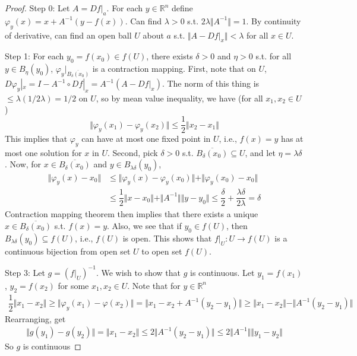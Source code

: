 \documentclass{article}
\theoremstyle{definition}
\theoremstyle{remark}
\theoremstyle{plain}
\theoremstyle{definition}
\newcommand{\RR}{\mathbb{R}}
\begin{document}
\begin{proof}
    Step 0: Let $A=Df|_a$. For each $y\in\RR^n$ define $\varphi_y(x)=x+A^{-1}(y-f(x))$.
    Can find $\lambda>0$ s.t. $2\lambda\Vert A^{-1}\Vert=1$. By continuity of derivative, can find an open ball $U$ about $a$ s.t. $\Vert A-Df|_x\Vert<\lambda$ for all $x\in U$. 

    Step 1: For each $y_0=f(x_0)\in f(U)$, there exists $\delta>0$ and $\eta>0$ s.t. for all $y\in B_{\eta}(y_0)$, $\varphi_y|_{\overline{B_{\delta}(x_0)}}$ is a contraction mapping. First, note that on $U$, $D\varphi_y|_x=I-A^{-1}\circ Df|_x=A^{-1}(A-Df|_x)$. The norm of this thing is $\le \lambda(1/2\lambda)=1/2$ on $U$, so by mean value inequality, we have (for all $x_1,x_2\in U$)
    \[\Vert\varphi_y(x_1)-\varphi_y(x_2)\Vert\le \dfrac{1}{2}\Vert x_2-x_1\Vert\] This implies that $\varphi_y$ can have at most one fixed point in $U$, i.e., $f(x)=y$ has at most one solution for $x$ in $U$.
    Second, pick $\delta>0$ s.t. $\overline{B_\delta(x_0)}\subseteq U$, and let $\eta=\lambda \delta$. 
    Now, for $x\in \overline{B_\delta(x_0)}$ and $y\in B_{\lambda\delta}(y_0)$,
    \begin{align*}\Vert\varphi_y(x)-x_0\Vert&\le \Vert\varphi_y(x)-\varphi_y(x_0)\Vert+\Vert\varphi_y(x_0)-x_0\Vert\\
    &\le \dfrac{1}{2}\Vert x-x_0\Vert+\Vert A^{-1}\Vert \Vert y-y_0\Vert\le \dfrac{\delta}{2}+\dfrac{\lambda \delta}{2\lambda}=\delta
    \end{align*}
    Contraction mapping theorem then implies that there exists a unique $x\in \overline{B_\delta(x_0)}$ s.t. $f(x)=y$. Also, we see that if $y_0\in f(U)$, then $B_{\lambda\delta}(y_0)\subseteq f(U)$, i.e., $f(U)$ is open. This shows that $f|_U:U\to f(U)$ is a continuous bijection from open set $U$ to open set $f(U)$.

    Step 3: Let $g=(f|_U)^{-1}$. We wish to show that $g$ is continuous. Let $y_1=f(x_1)$, $y_2=f(x_2)$ for some $x_1,x_2\in U$.
    Note that for $y\in\RR^n$
    \begin{align*}
        \dfrac{1}{2}\Vert x_1-x_2\Vert\ge\Vert\varphi_y(x_1)-\varphi(x_2)\Vert=\Vert x_1-x_2+A^{-1}(y_2-y_1)\Vert\ge\Vert x_1-x_2\Vert-\Vert A^{-1}(y_2-y_1)\Vert
    \end{align*}
    Rearranging, get
    \begin{align*}
        \Vert g(y_1)-g(y_2)\Vert=\Vert x_1-x_2\Vert\le 2\Vert A^{-1}(y_2-y_1)\Vert\le2\Vert A^{-1}\Vert\Vert y_1-y_2\Vert
    \end{align*}
    So $g$ is continuous
\end{proof}
\end{document}
